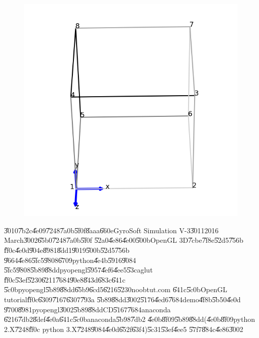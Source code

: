 \begin{figure}[th]
\begin{center}
{\includegraphics{./figs/construct_cube_8vertices_opengl.png}}
\end{center}
\end{figure}

\bigskip

\U{3010}\U{7b2c}\U{4e09}\U{7248}\U{7a0b}\U{5f0f}\U{8aaa}\U{660e}GyroSoft
Simulation V-3\U{3011}2016 March\U{3002}\U{65b0}\U{7248}\U{7a0b}\U{5f0f}%
\U{52a0}\U{4e86}\U{4e00}\U{500b}OpenGL 3D\U{7cbe}\U{7f8e}\U{52d5}\U{756b}%
\U{ff0c}\U{4e0d}\U{904e}\U{8981}\U{8dd1}\U{9019}\U{500b}\U{52d5}\U{756b}%
\U{9664}\U{4e86}\U{5fc5}\U{9808}\U{6709}python\U{4e4b}\U{5916}\U{9084}%
\U{5fc5}\U{9808}\U{5b89}\U{88dd}pyopengl\U{5957}\U{4ef6}\U{4ee5}\U{53ca}glut%
\U{ff0c}\U{53ef}\U{5230}\U{6211}\U{7684}\U{90e8}\U{843d}\U{683c}\U{641c}%
\U{5c0b}pyopengl\U{5b89}\U{88dd}\U{65b9}\U{6cd5}\U{6216}\U{5230}noobtut.com%
\U{641c}\U{5c0b}OpenGL tutorial\U{ff0c}\U{6309}\U{7167}\U{6307}\U{793a}%
\U{5b89}\U{88dd}\U{3002}\U{5176}\U{4ed6}\U{7684}demo\U{4f8b}\U{5b50}\U{4e0d}%
\U{9700}\U{8981}pyopengl\U{3002}\U{5b89}\U{88dd}CD\U{5167}\U{7684}anaconda%
\U{6216}\U{7db2}\U{8def}\U{4e0a}\U{641c}\U{5c0b}anaconda\U{5b98}\U{7db2}%
\U{4e0b}\U{8f09}\U{5b89}\U{88dd}(\U{4e0b}\U{8f09}python 2.X\U{7248}\U{ff0c}%
python 3.X\U{7248}\U{9084}\U{4e0d}\U{652f}\U{63f4})\U{5c31}\U{53ef}\U{4ee5}%
\U{57f7}\U{884c}\U{4e86}\U{3002}

